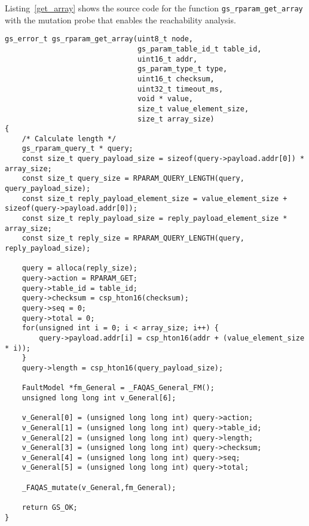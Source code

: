 Listing~\ref{get_array} shows the source code for the function \texttt{gs\_rparam\_get\_array} with the mutation probe that enables the reachability analysis.

\begin{lstlisting}[style=CStyle,float=t, caption=Instrumented code for function gs\_rparam\_get\_array., label=get_array]
gs_error_t gs_rparam_get_array(uint8_t node,
                               gs_param_table_id_t table_id,
                               uint16_t addr,
                               gs_param_type_t type,
                               uint16_t checksum,
                               uint32_t timeout_ms,
                               void * value,
                               size_t value_element_size,
                               size_t array_size)
{
    /* Calculate length */
    gs_rparam_query_t * query;
    const size_t query_payload_size = sizeof(query->payload.addr[0]) * array_size;
    const size_t query_size = RPARAM_QUERY_LENGTH(query, query_payload_size);
    const size_t reply_payload_element_size = value_element_size + sizeof(query->payload.addr[0]);
    const size_t reply_payload_size = reply_payload_element_size * array_size;
    const size_t reply_size = RPARAM_QUERY_LENGTH(query, reply_payload_size);

    query = alloca(reply_size);
    query->action = RPARAM_GET;
    query->table_id = table_id;
    query->checksum = csp_hton16(checksum);
    query->seq = 0;
    query->total = 0;
    for(unsigned int i = 0; i < array_size; i++) {
        query->payload.addr[i] = csp_hton16(addr + (value_element_size * i));
    }
    query->length = csp_hton16(query_payload_size);

    FaultModel *fm_General = _FAQAS_General_FM();
    unsigned long long int v_General[6];

    v_General[0] = (unsigned long long int) query->action;
    v_General[1] = (unsigned long long int) query->table_id;
    v_General[2] = (unsigned long long int) query->length;
    v_General[3] = (unsigned long long int) query->checksum;
    v_General[4] = (unsigned long long int) query->seq;
    v_General[5] = (unsigned long long int) query->total;

    _FAQAS_mutate(v_General,fm_General);

    return GS_OK;
}
\end{lstlisting}




